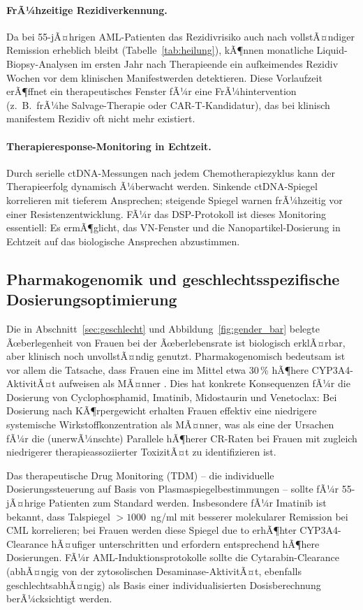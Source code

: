 ﻿\documentclass[12pt,a4paper]{article}
\theoremstyle{definition}
\begin{document}
\paragraph{FrÃ¼hzeitige Rezidiverkennung.}
Da bei 55-jÃ¤hrigen AML-Patienten das Rezidivrisiko auch nach vollstÃ¤ndiger Remission
erheblich bleibt (Tabelle~\ref{tab:heilung}), kÃ¶nnen monatliche Liquid-Biopsy-Analysen
im ersten Jahr nach Therapieende ein aufkeimendes Rezidiv Wochen vor dem klinischen
Manifestwerden detektieren. Diese Vorlaufzeit erÃ¶ffnet ein therapeutisches Fenster
fÃ¼r eine FrÃ¼hintervention (z.~B.\ frÃ¼he Salvage-Therapie oder CAR-T-Kandidatur), das
bei klinisch manifestem Rezidiv oft nicht mehr existiert.

\paragraph{Therapieresponse-Monitoring in Echtzeit.}
Durch serielle ctDNA-Messungen nach jedem Chemotherapiezyklus kann der Therapieerfolg
dynamisch Ã¼berwacht werden. Sinkende ctDNA-Spiegel korrelieren mit tieferem Ansprechen;
steigende Spiegel warnen frÃ¼hzeitig vor einer Resistenzentwicklung. FÃ¼r das DSP-Protokoll
ist dieses Monitoring essentiell: Es ermÃ¶glicht, das VN-Fenster und die Nanopartikel-Dosierung
in Echtzeit auf das biologische Ansprechen abzustimmen.

\subsection{Pharmakogenomik und geschlechtsspezifische Dosierungsoptimierung}

Die in Abschnitt~\ref{sec:geschlecht} und Abbildung~\ref{fig:gender_bar} belegte
Ãœberlegenheit von Frauen bei der Ãœberlebensrate ist biologisch erklÃ¤rbar, aber
klinisch noch unvollstÃ¤ndig genutzt. Pharmakogenomisch bedeutsam ist vor allem die
Tatsache, dass Frauen eine im Mittel etwa 30\,\% hÃ¶here CYP3A4-AktivitÃ¤t aufweisen
als MÃ¤nner \cite{frey2010}. Dies hat konkrete Konsequenzen fÃ¼r die Dosierung von
Cyclophosphamid, Imatinib, Midostaurin und Venetoclax: Bei Dosierung nach KÃ¶rpergewicht
erhalten Frauen effektiv eine niedrigere systemische Wirkstoffkonzentration als MÃ¤nner,
was als eine der Ursachen fÃ¼r die (unerwÃ¼nschte) Parallele hÃ¶herer CR-Raten bei
Frauen mit zugleich niedrigerer therapieassoziierter ToxizitÃ¤t zu identifizieren ist.

Das therapeutische Drug Monitoring (TDM) -- die individuelle Dosierungssteuerung auf
Basis von Plasmaspiegelbestimmungen -- sollte fÃ¼r 55-jÃ¤hrige Patienten zum Standard
werden. Insbesondere fÃ¼r Imatinib ist bekannt, dass Talspiegel $>1000$~ng/ml mit
besserer molekularer Remission bei CML korrelieren; bei Frauen werden diese Spiegel
due to erhÃ¶hter CYP3A4-Clearance hÃ¤ufiger unterschritten und erfordern entsprechend
hÃ¶here Dosierungen. FÃ¼r AML-Induktionsprotokolle sollte die Cytarabin-Clearance
(abhÃ¤ngig von der zytosolischen Desaminase-AktivitÃ¤t, ebenfalls geschlechtsabhÃ¤ngig)
als Basis einer individualisierten Dosisberechnung berÃ¼cksichtigt werden.
\end{document}
